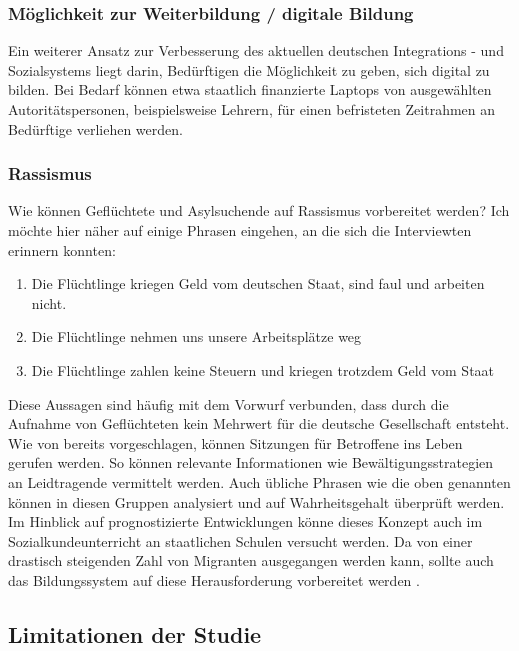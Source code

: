 \subsubsection{Möglichkeit zur Weiterbildung / digitale Bildung}
Ein weiterer Ansatz zur Verbesserung des aktuellen deutschen Integrations - und Sozialsystems liegt darin, Bedürftigen die Möglichkeit zu geben, sich digital zu bilden. Bei Bedarf können etwa staatlich finanzierte Laptops von ausgewählten Autoritätspersonen, beispielsweise Lehrern, für einen befristeten Zeitrahmen an Bedürftige verliehen werden.\newline

\subsubsection{Rassismus}

Wie können Geflüchtete und Asylsuchende auf Rassismus vorbereitet werden?\newline
Ich möchte hier näher auf einige Phrasen eingehen, an die sich die Interviewten erinnern konnten:
\begin{enumerate}
    \item Die Flüchtlinge kriegen Geld vom deutschen Staat, sind faul und arbeiten nicht.
    \item Die Flüchtlinge nehmen uns unsere Arbeitsplätze weg
    \item Die Flüchtlinge zahlen keine Steuern und kriegen trotzdem Geld vom Staat
\end{enumerate}
Diese Aussagen sind häufig mit dem Vorwurf verbunden, dass durch die Aufnahme von Geflüchteten kein Mehrwert für die deutsche Gesellschaft entsteht.\newline
Wie von \citet{hakim2006information} bereits vorgeschlagen, können Sitzungen für Betroffene ins Leben gerufen werden. So können relevante Informationen wie Bewältigungsstrategien an Leidtragende vermittelt werden. Auch übliche Phrasen wie die oben genannten können in diesen Gruppen analysiert und auf Wahrheitsgehalt überprüft werden.\newline
Im Hinblick auf prognostizierte Entwicklungen könne dieses Konzept auch im Sozialkundeunterricht an staatlichen Schulen versucht werden. Da von einer drastisch steigenden Zahl von Migranten ausgegangen werden kann, sollte auch das Bildungssystem auf diese Herausforderung vorbereitet werden \citep{migration2018report}.

\subsection{Limitationen der Studie}

